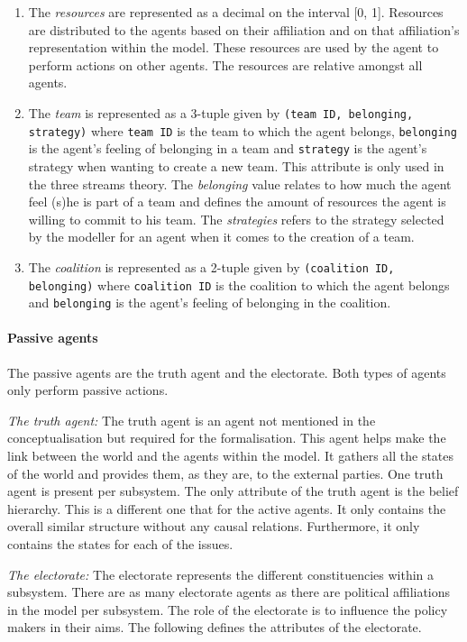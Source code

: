 \begin{enumerate}
\item The \emph{resources} are represented as a decimal on the interval [0, 1]. Resources are distributed to the agents based on their affiliation and on that affiliation's representation within the model. These resources are used by the agent to perform actions on other agents. The resources are relative amongst all agents.

\item The \emph{team} is represented as a 3-tuple given by \texttt{(team ID, belonging, strategy)} where \texttt{team ID} is the team to which the agent belongs, \texttt{belonging} is the agent’s feeling of belonging in a team and \texttt{strategy} is the agent's strategy when wanting to create a new team.  This attribute is only used in the three streams theory. The \emph{belonging} value relates to how much the agent feel (s)he is part of a team and defines the amount of resources the agent is willing to commit to his team. The \emph{strategies} refers to the strategy selected by the modeller for an agent when it comes to the creation of a team.

\item The \emph{coalition} is represented as a 2-tuple given by \texttt{(coalition ID, belonging)} where \texttt{coalition ID} is the coalition to which the agent belongs and \texttt{belonging} is the agent’s feeling of belonging in the coalition.

\end{enumerate}

\paragraph{Passive agents}

The passive agents are the truth agent and the electorate. Both types of agents only perform passive actions.

\emph{The truth agent: } The truth agent is an agent not mentioned in the conceptualisation but required for the formalisation. This agent helps make the link between the world and the agents within the model. It gathers all the states of the world and provides them, as they are, to the external parties. One truth agent is present per subsystem. The only attribute of the truth agent is the belief hierarchy. This is a different one that for the active agents. It only contains the overall similar structure without any causal relations. Furthermore, it only contains the states for each of the issues.

\emph{The electorate: } The electorate represents the different constituencies within a subsystem. There are as many electorate agents as there are political affiliations in the model per subsystem. The role of the electorate is to influence the policy makers in their aims. The following defines the attributes of the electorate.

